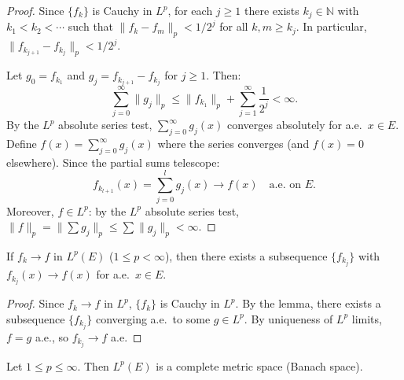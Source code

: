 \documentclass[11pt]{report}
\begin{document}
\begin{proof}
Since $\{f_k\}$ is Cauchy in $L^p$, for each $j \geq 1$ there exists $k_j \in \mathbb{N}$ with $k_1 < k_2 < \cdots$ such that $\|f_k - f_m\|_p < 1/2^j$ for all $k, m \geq k_j$. In particular, $\|f_{k_{j+1}} - f_{k_j}\|_p < 1/2^j$.

Let $g_0 = f_{k_1}$ and $g_j = f_{k_{j+1}} - f_{k_j}$ for $j \geq 1$. Then:
\[
\sum_{j=0}^{\infty} \|g_j\|_p \leq \|f_{k_1}\|_p + \sum_{j=1}^{\infty} \frac{1}{2^j} < \infty.
\]
By the $L^p$ absolute series test, $\sum_{j=0}^{\infty} g_j(x)$ converges absolutely for a.e.\ $x \in E$. Define $f(x) = \sum_{j=0}^{\infty} g_j(x)$ where the series converges (and $f(x) = 0$ elsewhere). Since the partial sums telescope:
\[
f_{k_{l+1}}(x) = \sum_{j=0}^{l} g_j(x) \to f(x) \quad \text{a.e.\ on } E.
\]
Moreover, $f \in L^p$: by the $L^p$ absolute series test, $\|f\|_p = \|\sum g_j\|_p \leq \sum \|g_j\|_p < \infty$.
\end{proof}

\begin{corbox}
If $f_k \to f$ in $L^p(E)$ ($1 \leq p < \infty$), then there exists a subsequence $\{f_{k_j}\}$ with $f_{k_j}(x) \to f(x)$ for a.e.\ $x \in E$.
\end{corbox}

\begin{proof}
Since $f_k \to f$ in $L^p$, $\{f_k\}$ is Cauchy in $L^p$. By the lemma, there exists a subsequence $\{f_{k_j}\}$ converging a.e.\ to some $g \in L^p$. By uniqueness of $L^p$ limits, $f = g$ a.e., so $f_{k_j} \to f$ a.e.
\end{proof}

\begin{thmbox}
Let $1 \leq p \leq \infty$. Then $L^p(E)$ is a complete metric space (Banach space).
\end{thmbox}
\end{document}
